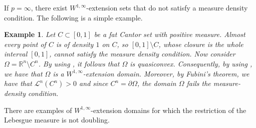 \documentclass[reqno]{amsart}
\numberwithin{equation}{section}
\newtheorem{example}[theorem]{Example}
\theoremstyle{remark}
\begin{document}
If $p=\infty$, there exist $W^{1,\infty}$-extension sets that do not satisfy a measure density condition. The following is a simple example.
\begin{example}\label{ex:1}
{\em Let $C\subset [0,1]$ be a fat Cantor set with positive measure. Almost every point of $C$ is of density $1$ on $C$, so $[0,1]\setminus C$, whose closure is the whole interval $[0,1]$, cannot satisfy the measure density condition. Now consider $\Omega =\mathbb{R}^n\setminus C^n$. By using \cite[Theorem A]{HH2008}, it follows that $\Omega$ is quasiconvex. Consequently, by using , we have that $\Omega$ is a $W^{1,\infty}$-extension domain. Moreover, by Fubini's theorem, we have that $\mathcal{L}^{n}(C^n) > 0$ and since $C^n=\partial\Omega$, the domain $\Omega$ fails the measure-density condition.}
\end{example}
There are examples of $W^{1,\infty}$-extension domains for which the restriction of the Lebesgue measure is not doubling.
\end{document}
